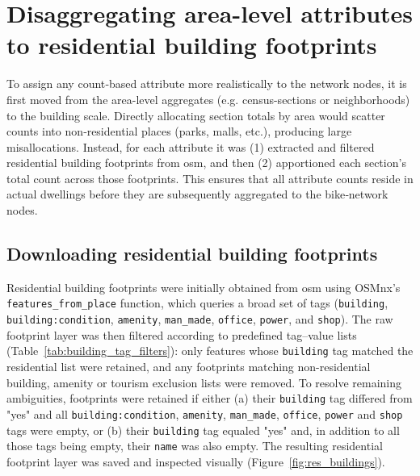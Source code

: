 \section{Disaggregating area-level attributes to residential building footprints}
  \label{app_paper1:pop_distribution}
  \setcounter{figure}{0}
  \setcounter{table}{0}
  \renewcommand{\thefigure}{A.4.\arabic{figure}}
  \renewcommand{\thetable}{A.4.\arabic{table}}

  To assign any count‐based attribute more realistically to the network nodes, it is first moved from the area-level aggregates (e.g. census-sections or neighborhoods) to the building scale. Directly allocating section totals by area would scatter counts into non‐residential places (parks, malls, etc.), producing large misallocations. Instead, for each attribute it was (1) extracted and filtered residential building footprints from \acs{osm}, and then (2) apportioned each section's total count across those footprints. This ensures that all attribute counts reside in actual dwellings before they are subsequently aggregated to the bike‐network nodes. 

  \subsection{Downloading residential building footprints}
    Residential building footprints were initially obtained from \acs{osm} using OSMnx's \texttt{features\_from\_place} function, which queries a broad set of tags (\texttt{building}, \texttt{building\string:condition}, \texttt{amenity}, \texttt{man\_made}, \texttt{office}, \texttt{power}, and \texttt{shop}). The raw footprint layer was then filtered according to predefined tag–value lists (Table~\ref{tab:building_tag_filters}): only features whose \texttt{building} tag matched the residential list were retained, and any footprints matching non-residential building, amenity or tourism exclusion lists were removed.  To resolve remaining ambiguities, footprints were retained if either (a) their \texttt{building} tag differed from "yes" and all \texttt{building:condition}, \texttt{amenity}, \texttt{man\_made}, \texttt{office}, \texttt{power} and \texttt{shop} tags were empty, or (b) their \texttt{building} tag equaled "yes" and, in addition to all those tags being empty, their \texttt{name} was also empty.  The resulting residential footprint layer was saved and inspected visually (Figure~\ref{fig:res_buildings}).  

